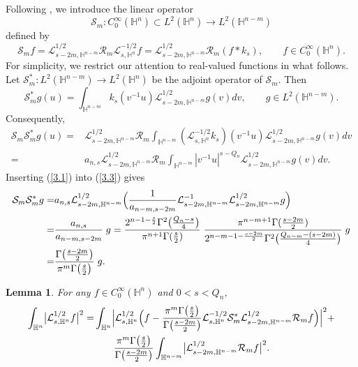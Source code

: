 \documentclass[12pt,reqno]{amsart}%
\theoremstyle{plain}
\newtheorem{lemma}{Lemma}[section]
\numberwithin{equation}{section}
\begin{document}
Following \cite{bez}, we introduce the linear operator
\[
\mathcal{S}_{m}: C_{0}^{\infty}(\mathbb{H}^{n})\subset L^2(\mathbb{H}^{n}) \longrightarrow L^2(\mathbb{H}^{n-m})
\]
defined by
\[
\mathcal{S}_{m}f = \mathcal{L}_{s-2m,\mathbb{H}^{n-m}}^{1/2}\mathcal{R}_{m}
\mathcal{L}_{s,\mathbb{H}^{n}}^{-1/2}f
= \mathcal{L}_{s-2m,\mathbb{H}^{n-m}}^{1/2}\mathcal{R}_{m}(f\ast k_s),
\qquad f\in C_{0}^{\infty}(\mathbb{H}^{n}).
\]
For simplicity, we restrict our attention to real-valued functions in what follows.
Let \(\mathcal{S}_{m}^{*}: L^2(\mathbb{H}^{n-m})\to L^2(\mathbb{H}^{n})\) be the adjoint operator of \(\mathcal{S}_{m}\). Then
\[
\mathcal{S}_{m}^{*}g(u)=\int_{\mathbb{H}^{n-m}}k_s(v^{-1}u)
\mathcal{L}_{s-2m,\mathbb{H}^{n-m}}^{1/2}g(v)dv,\qquad g\in L^2(\mathbb{H}^{n-m}).
\]
Consequently,
\begin{align}\nonumber
\mathcal{S}_{m}\mathcal{S}_{m}^{*}g(u)
=& \mathcal{L}_{s-2m,\mathbb{H}^{n-m}}^{1/2}\mathcal{R}_{m}
\int_{\mathbb{H}^{n-m}}(\mathcal{L}_{s,\mathbb{H}^{n}}^{-1/2}k_s)(v^{-1}u)
\mathcal{L}_{s-2m,\mathbb{H}^{n-m}}^{1/2}g(v)dv \\
\label{3.3}
=& a_{n,s}\mathcal{L}_{s-2m,\mathbb{H}^{n-m}}^{1/2}\mathcal{R}_{m}
\int_{\mathbb{H}^{n-m}}|v^{-1}u|^{s-Q_n}
\mathcal{L}_{s-2m,\mathbb{H}^{n-m}}^{1/2}g(v)dv.
\end{align}
Inserting (\ref{3.1}) into (\ref{3.3}) gives
\begin{align}\nonumber
\mathcal{S}_{m}\mathcal{S}_{m}^{*}g
=& a_{n,s}\mathcal{L}_{s-2m,\mathbb{H}^{n-m}}^{1/2}
\Bigl(\frac{1}{a_{n-m,s-2m}}
\mathcal{L}_{s-2m,\mathbb{H}^{n-m}}^{-1}
\mathcal{L}_{s-2m,\mathbb{H}^{n-m}}^{1/2}g\Bigr)\\
\nonumber
=&\frac{a_{n,s}}{a_{n-m,s-2m}}\; g= \frac{2^{n-1-\frac{s}{2}}\Gamma^2\bigl(\frac{Q_n-s}{4}\bigr)}
{\pi^{n+1}\Gamma(\frac{s}{2})}\;
\frac{\pi^{n-m+1}\Gamma(\frac{s-2m}{2})}
{2^{n-m-1-\frac{s-2m}{2}}\Gamma^2\bigl(\frac{Q_{n-m}-(s-2m)}{4}\bigr)}\; g\\
\label{3.4}
=& \frac{\Gamma\bigl(\frac{s-2m}{2}\bigr)}{\pi^{m}\Gamma\bigl(\frac{s}{2}\bigr)}\; g .
\end{align}



\begin{lemma}\label{lm4.1}
For any \(f\in C_{0}^{\infty}(\mathbb{H}^{n})\) and \(0<s< Q_n\),
\begin{align*}
\int_{\mathbb{H}^{n}}\bigl|\mathcal{L}_{s,\mathbb{H}^{n}}^{1/2}f\bigr|^{2}
=& \int_{\mathbb{H}^{n}}\Bigl|\mathcal{L}_{s,\mathbb{H}^{n}}^{1/2}\Bigl(f-
\frac{\pi^{m}\Gamma\bigl(\frac{s}{2}\bigr)}{\Gamma\bigl(\frac{s-2m}{2}\bigr)}
\mathcal{L}_{s,\mathbb{H}^{n}}^{-1/2}\mathcal{S}_{m}^{\ast}
\mathcal{L}_{s-2m,\mathbb{H}^{n-m}}^{1/2}\mathcal{R}_{m}f\Bigr)\Bigr|^{2} +\\
&\qquad \frac{\pi^{m}\Gamma\bigl(\frac{s}{2}\bigr)}{\Gamma\bigl(\frac{s-2m}{2}\bigr)}
\int_{\mathbb{H}^{n-m}}\bigl|\mathcal{L}_{s-2m,\mathbb{H}^{n-m}}^{1/2}\mathcal{R}_{m}f\bigr|^{2}.
\end{align*}
\end{lemma}
\end{document}
